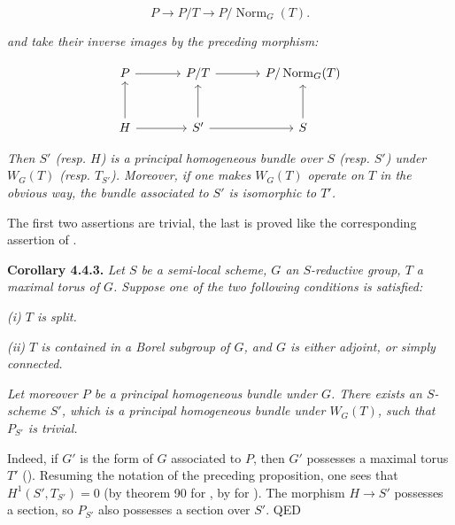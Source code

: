 \[
  P\longrightarrow P/T\longrightarrow P/\operatorname{Norm}_G(T).
\]

\emph{and take their inverse images by the preceding morphism:}

\[
\begin{tikzcd}[column sep=large,row sep=large]
P \arrow[r]
&
P/T \arrow[r]
&
P/\operatorname{Norm}_G(T)
\\
H \arrow[u] \arrow[r]
&
S' \arrow[u] \arrow[r]
&
S \arrow[u]
\end{tikzcd}


\]

\emph{Then \(S'\) (resp. \(H\)) is a principal homogeneous bundle over \(S\) (resp. \(S'\)) under \(W_{G}(T)\) (resp. \(T_{S'}\)).
Moreover, if one makes \(W_{G}(T)\) operate on \(T\) in the obvious way, the bundle associated to \(S'\) is isomorphic to
\(T'\).}

The first two assertions are trivial, the last is proved like the corresponding assertion of .

\textbf{Corollary 4.4.3.} \emph{Let \(S\) be a semi-local scheme, \(G\) an \(S\)-reductive group, \(T\) a maximal torus of \(G\). Suppose
one of the two following conditions is satisfied:}

\emph{(i) \(T\) is split.}

\emph{(ii) \(T\) is contained in a Borel subgroup of \(G\), and \(G\) is either adjoint, or simply connected.}

\emph{Let moreover \(P\) be a principal homogeneous bundle under \(G\). There exists an \(S\)-scheme \(S'\), which is a principal
homogeneous bundle under \(W_{G}(T)\), such that \(P_{S'}\) is trivial.}

Indeed, if \(G'\) is the form of \(G\) associated to \(P\), then \(G'\) possesses a maximal torus \(T'\) ().
Resuming the notation of the preceding proposition, one sees that \(H^{1}(S', T_{S'}) = 0\) (by theorem 90 for , by
 for ). The morphism \(H \to S'\) possesses a section, so \(P_{S'}\) also possesses a section over \(S'\). QED


